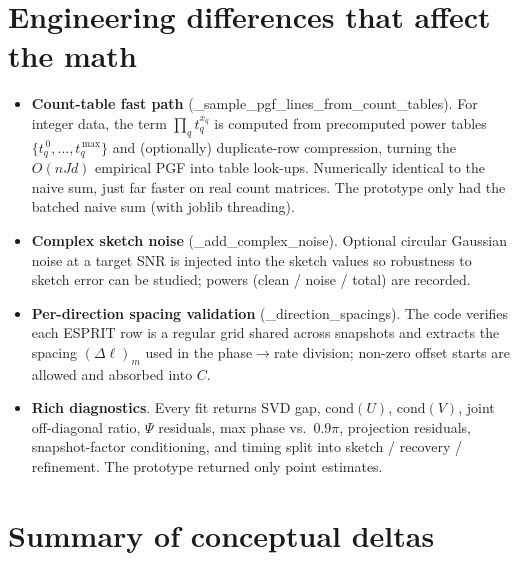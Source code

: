 \documentclass[11pt]{article}
\newcommand{\code}[1]{\texttt{\small #1}}
\def\code#1{#1}%
\def\small{}%
\theoremstyle{definition}
\begin{document}
\section{Engineering differences that affect the math}
\begin{itemize}[leftmargin=2em, itemsep=2pt]
  \item \textbf{Count-table fast path} (\code{\_sample\_pgf\_lines\_from\_count\_tables}). For
        integer data, the term $\prod_q t_q^{x_q}$ is computed from precomputed power tables
        $\{t_q^{\,0},\dots,t_q^{\,\max}\}$ and (optionally) duplicate-row compression, turning the
        $O(nJd)$ empirical PGF into table look-ups. Numerically identical to the naive sum, just
        far faster on real count matrices. The prototype only had the batched naive sum
        (with \code{joblib} threading).
  \item \textbf{Complex sketch noise} (\code{\_add\_complex\_noise}). Optional circular Gaussian
        noise at a target SNR is injected into the sketch values so robustness to sketch error
        can be studied; powers (clean / noise / total) are recorded.
  \item \textbf{Per-direction spacing validation} (\code{\_direction\_spacings}). The code
        verifies each ESPRIT row is a regular grid shared across snapshots and extracts the
        spacing $(\Delta\ell)_m$ used in the phase$\to$rate division; non-zero offset starts are
        allowed and absorbed into $C$.
  \item \textbf{Rich diagnostics}. Every fit returns SVD gap, $\mathrm{cond}(U)$,
        $\mathrm{cond}(V)$, joint off-diagonal ratio, $\Psi$ residuals, max phase vs.\
        $0.9\pi$, projection residuals, snapshot-factor conditioning, and timing split into
        sketch / recovery / refinement. The prototype returned only point estimates.
\end{itemize}

\section{Summary of conceptual deltas}
\end{document}
